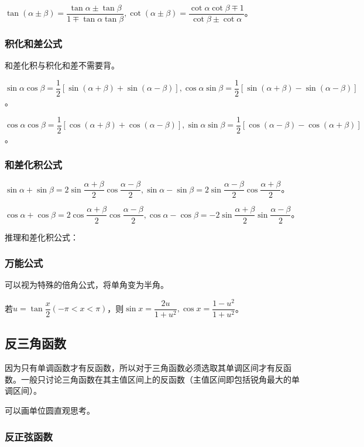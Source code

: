 \documentclass[UTF8, 12pt]{ctexart}
\begin{document}
$\tan(\alpha\pm\beta)=\dfrac{\tan\alpha\pm\tan\beta}{1\mp\tan\alpha\tan\beta},\cot(\alpha\pm\beta)=\dfrac{\cot\alpha\cot\beta\mp 1}{\cot\beta\pm\cot\alpha}$。

\subsubsection{积化和差公式}

和差化积与积化和差不需要背。

$\sin\alpha\cos\beta=\dfrac{1}{2}[\sin(\alpha+\beta)+\sin(\alpha-\beta)],\cos\alpha\sin\beta=\dfrac{1}{2}[\sin(\alpha+\beta)-\sin(\alpha-\beta)]$。

$\cos\alpha\cos\beta=\dfrac{1}{2}[\cos(\alpha+\beta)+\cos(\alpha-\beta)],\sin\alpha\sin\beta=\dfrac{1}{2}[\cos(\alpha-\beta)-\cos(\alpha+\beta)]$。

\subsubsection{和差化积公式}

$\sin\alpha+\sin\beta=2\sin\dfrac{\alpha+\beta}{2}\cos\dfrac{\alpha-\beta}{2},\sin\alpha-\sin\beta=2\sin\dfrac{\alpha-\beta}{2}\cos\dfrac{\alpha+\beta}{2}$。

$\cos\alpha+\cos\beta=2\cos\dfrac{\alpha+\beta}{2}\cos\dfrac{\alpha-\beta}{2},\cos\alpha-\cos\beta=-2\sin\dfrac{\alpha+\beta}{2}\sin\dfrac{\alpha-\beta}{2}$。

推理和差化积公式：

\subsubsection{万能公式}

可以视为特殊的倍角公式，将单角变为半角。

若$u=\tan\dfrac{x}{2}(-\pi<x<\pi)$，则$\sin x=\dfrac{2u}{1+u^2},\cos x=\dfrac{1-u^2}{1+u^2}$。

\subsection{反三角函数}

因为只有单调函数才有反函数，所以对于三角函数必须选取其单调区间才有反函数。一般只讨论三角函数在其主值区间上的反函数（主值区间即包括锐角最大的单调区间）。

可以画单位圆直观思考。

\subsubsection{反正弦函数}
\end{document}
